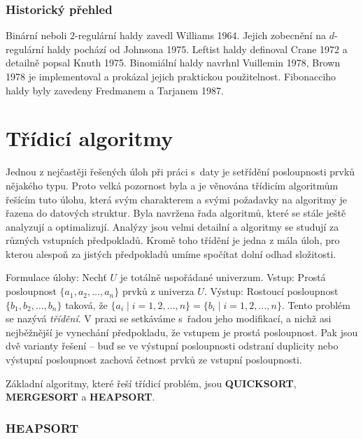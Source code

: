 \documentclass[a4paper,12pt]{article}
\begin{document}
\subsubsection{Historický přehled}

Binární neboli $2$-regulární haldy 
zavedl Williams 1964.  Jejich zobecnění na $d$-regulární haldy 
pochází od Johnsona 1975.  Leftist haldy definoval Crane 1972 a 
detailně popsal Knuth 1975.  Binomiální haldy navrhnl Vuillemin 
1978, Brown 1978 je implementoval a prokázal jejich praktickou 
použitelnost.  Fibonacciho haldy byly zavedeny Fredmanem a 
Tarjanem 1987.  

\section{{Třídicí algoritmy}}

Jednou z nejčastěji řešených úloh při práci s~daty je setřídění 
posloupnosti prvků nějakého typu. Proto velká pozornost byla a je věnována 
třídicím algoritmům řešícím tuto úlohu, která 
svým charakterem a svými 
požadavky na algoritmy je řazena do datových 
struktur. Byla navržena řada algoritmů, které se 
stále ještě analyzují a optimalizují. Analýzy jsou velmi detailní a algoritmy se 
studují za různých vstupních předpokladů. 
Kromě toho třídění je jedna z mála úloh, pro kterou 
alespoň za jistých 
předpokladů umíme spočítat dolní odhad složitosti.

Formulace úlohy:\newline 
Nechť $U$ je totálně uspořádané univerzum.\newline 
Vstup: Prostá posloupnost $\{a_1,a_2,\dots,a_n\}$ prvků z 
univerza $U$.\newline 
Výstup: Rostoucí posloupnost $\{b_1,b_2,\dots,b_n\}$ taková, že 
$\{a_i\mid i=1,2,\dots,n\}=\{b_i\mid i=1,2,\dots,n\}$.\newline 
Tento problém se nazývá \emph{třídění}. 
V praxi se setkáváme s~řadou jeho modifikací, a nichž 
asi nejběžnější je vynechání předpokladu, že 
vstupem je prostá posloupnost. Pak jsou dvě varianty 
řešení -- buď se ve výstupní posloupnosti odstraní 
duplicity nebo výstupní posloupnost zachová četnost prvků ze 
vstupní posloupnosti.

Základní algoritmy, které  řeší třídicí 
problém, jsou {\bf QUICKSORT}, {\bf MERGESORT} a {\bf HEAP\-SORT}. 

\subsubsection{HEAPSORT}
\end{document}
